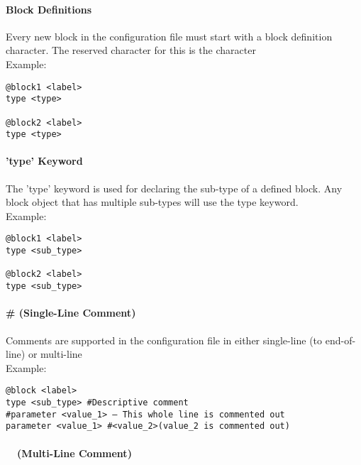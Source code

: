 \paragraph*{\command Block Definitions}

Every new block in the configuration file must start with a block definition character. The reserved character for this is the \command character\\

Example:

{\small{\begin{verbatim}
@block1 <label>
type <type>

@block2 <label>
type <type>
\end{verbatim}}}

\paragraph*{'type' Keyword}

The 'type' keyword is used for declaring the sub-type of a defined block. Any block object that has multiple sub-types will use the type keyword.\\

Example:

{\small{\begin{verbatim}
@block1 <label>
type <sub_type>

@block2 <label>
type <sub_type>
\end{verbatim}}}

\paragraph*{\# (Single-Line Comment)}

Comments are supported in the configuration file in either single-line (to end-of-line) or multi-line\\

Example:

{\small{\begin{verbatim}
@block <label>
type <sub_type> #Descriptive comment
#parameter <value_1> – This whole line is commented out
parameter <value_1> #<value_2>(value_2 is commented out)
\end{verbatim}}}

\paragraph*{\commentstart\ \commentend\ (Multi-Line Comment)}

